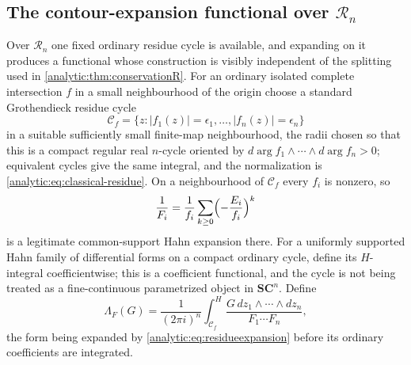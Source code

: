 \documentclass[11pt,letterpaper]{article}
\theoremstyle{definition}
\theoremstyle{remark}
\newcommand{\SC}{\mathbf{SC}}
\newcommand{\RR}{\mathscr R}
\newcommand{\HInt}{\mathop{\int}\nolimits^{\!H}}
\numberwithin{equation}{section}
\begin{document}
\subsection{The contour-expansion functional over $\RR_n$}
\label{analytic:subsec:contour-residue}
Over $\RR_n$ one fixed ordinary residue cycle is available, and expanding
on it produces a functional whose construction is visibly independent of the
splitting used in \cref{analytic:thm:conservationR}. For an ordinary
isolated complete intersection $f$ in a small neighbourhood of the origin
choose a standard Grothendieck residue cycle
\[
 \mathcal C_f=\{z:|f_1(z)|=\epsilon_1,\ldots,|f_n(z)|=\epsilon_n\}
\]
in a suitable sufficiently small finite-map neighbourhood, the radii chosen
so that this is a compact regular real $n$-cycle oriented by
$d\arg f_1\wedge\cdots\wedge d\arg f_n>0$; equivalent cycles give the same
integral, and the normalization is
\eqref{analytic:eq:classical-residue}. On a neighbourhood of
$\mathcal C_f$ every $f_i$ is nonzero, so
\begin{equation}\label{analytic:eq:residueexpansion}
 \frac1{F_i}=\frac1{f_i}\sum_{k\ge0}\Bigl(-\frac{E_i}{f_i}\Bigr)^k
\end{equation}
is a legitimate common-support Hahn expansion there. For a uniformly
supported Hahn family of differential forms on a compact ordinary cycle,
define its $H$-integral coefficientwise; this is a coefficient functional,
and the cycle is not being treated as a fine-continuous parametrized object
in $\SC^n$. Define
\begin{equation}\label{analytic:eq:hahn-contour-residue}
 \Lambda_F(G)=\frac1{(2\pi i)^n}
 \HInt_{\mathcal C_f}
 \frac{G\,dz_1\wedge\cdots\wedge dz_n}{F_1\cdots F_n},
\end{equation}
the form being expanded by \eqref{analytic:eq:residueexpansion} before its
ordinary coefficients are integrated.
\end{document}
